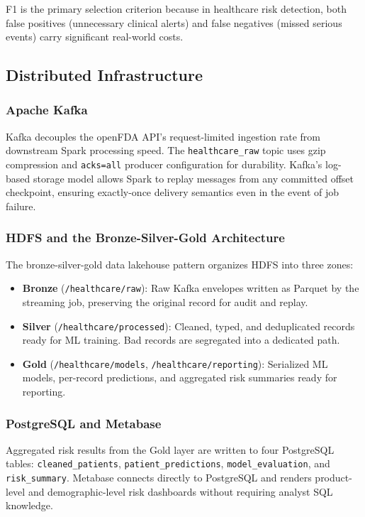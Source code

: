 \documentclass[conference]{IEEEtran}
\begin{document}
F1 is the primary selection criterion because in healthcare risk detection, both false positives (unnecessary clinical alerts) and false negatives (missed serious events) carry significant real-world costs.

\subsection{Distributed Infrastructure}

\subsubsection{Apache Kafka}
Kafka decouples the openFDA API's request-limited ingestion rate from downstream Spark processing speed. The \texttt{healthcare\_raw} topic uses gzip compression and \texttt{acks=all} producer configuration for durability. Kafka's log-based storage model allows Spark to replay messages from any committed offset checkpoint, ensuring exactly-once delivery semantics even in the event of job failure.

\subsubsection{HDFS and the Bronze-Silver-Gold Architecture}
The bronze-silver-gold data lakehouse pattern organizes HDFS into three zones:
\begin{itemize}
    \item \textbf{Bronze} (\texttt{/healthcare/raw}): Raw Kafka envelopes written as Parquet by the streaming job, preserving the original record for audit and replay.
    \item \textbf{Silver} (\texttt{/healthcare/processed}): Cleaned, typed, and deduplicated records ready for ML training. Bad records are segregated into a dedicated path.
    \item \textbf{Gold} (\texttt{/healthcare/models}, \texttt{/healthcare/reporting}): Serialized ML models, per-record predictions, and aggregated risk summaries ready for reporting.
\end{itemize}

\subsubsection{PostgreSQL and Metabase}
Aggregated risk results from the Gold layer are written to four PostgreSQL tables: \texttt{cleaned\_patients}, \texttt{patient\_predictions}, \texttt{model\_evaluation}, and \texttt{risk\_summary}. Metabase connects directly to PostgreSQL and renders product-level and demographic-level risk dashboards without requiring analyst SQL knowledge.
\end{document}
